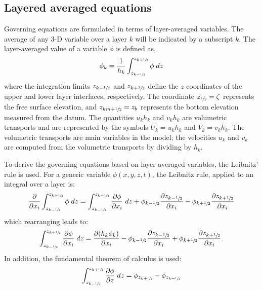 \subsection{Layered averaged equations}
Governing equations are formulated in terms of layer-averaged variables. The average of any 3-D variable over a layer $k$ will be indicated by a subscript $k$. The layer-averaged value of a variable $\phi$ is defined as,
\begin{equation}
    \phi_k = \frac{1}{h_k}\int_{z_{k-\sfrac{1}{2}}}^{z_{k+\sfrac{1}{2}}}\phi\; dz
\end{equation}
where the integration limits $z_{k-\sfrac{1}{2}}$ and $z_{k+\sfrac{1}{2}}$ define the $z$ coordinates of the upper and lower layer interfaces, respectively. The coordinate $z_{\sfrac{1}{2}}=\zeta$ represents the free surface elevation, and $z_{km+\sfrac{1}{2}} = z_b$ represents the bottom elevation measured from the datum. The quantities $u_k h_k$ and $v_k h_k$ are volumetric transports and are represented by the symbols $U_k=u_k h_k$ and $V_k=v_k h_k$. The volumetric transports are main variables in the model; the velocities $u_k$ and $v_k$ are computed from the volumetric transports by dividing by $h_k$.

To derive the governing equations based on layer-averaged variables, the Leibnitz' rule is used. For a generic variable $\phi(x, y,z, t)$, the Leibnitz rule, applied to an integral over a layer is:
\begin{equation}
    \frac{\partial}{\partial x_i} \int_{z_{k-\sfrac{1}{2}}}^{z_{k+\sfrac{1}{2}}} \phi\;dz = \int_{z_{k-\sfrac{1}{2}}}^{z_{k+\sfrac{1}{2}}} \frac{\partial \phi}{\partial x_i} \;dz + \phi_{k-\sfrac{1}{2}}\frac{\partial z_{k-\sfrac{1}{2} }}{\partial x_i}- \phi_{k+\sfrac{1}{2}}\frac{\partial z_{k+\sfrac{1}{2} }}{\partial x_i}
\end{equation}
which rearranging leads to:
\begin{equation}
   \int_{z_{k-\sfrac{1}{2}}}^{z_{k+\sfrac{1}{2}}} \frac{\partial \phi}{\partial x_i} \;dz = \frac{\partial (h_k\phi_k)}{\partial x_i}  - \phi_{k-\sfrac{1}{2}}\frac{\partial z_{k-\sfrac{1}{2} }}{\partial x_i} + \phi_{k+\sfrac{1}{2}}\frac{\partial z_{k+\sfrac{1}{2} }}{\partial x_i}.
   \label{eq:leibnitz}
\end{equation}
In addition, the fundamental theorem of calculus is used:
\begin{equation}
    \int_{z_{k-\sfrac{1}{2}}}^{z_{k+\sfrac{1}{2}}} \frac{\partial \phi}{\partial z} \;dz = \phi_{z_{k+\sfrac{1}{2}}} - \phi_{z_{k-\sfrac{1}{2}}}
    \label{eq:FTC}
\end{equation}


